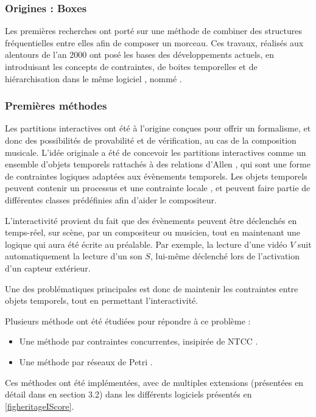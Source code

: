 \subsubsection{Origines : Boxes}
Les premières recherches ont porté sur une méthode de combiner des structures fréquentielles entre elles afin de composer un morceau. Ces travaux, réalisés aux alentours de l'an $\num{2000}$ ont posé les bases des développements actuels, en introduisant les concepts de contraintes, de boites temporelles et de hiérarchisation dans le même logiciel \cite{beurive2000logiciel}, nommé .
\subsubsection{Premières méthodes}
Les partitions interactives ont été à l'origine conçues pour offrir un formalisme, et donc des possibilités de provabilité et de vérification, au cas de la composition musicale. 
L'idée originale a été de concevoir les partitions interactives comme un ensemble d'objets temporels rattachés à des relations d'Allen \cite{allen1983maintaining}, qui sont une forme de contraintes logiques adaptées aux évènements temporels. Les objets temporels peuvent contenir un processus et une contrainte locale \cite{allombert2007system}, et peuvent faire partie de différentes classes prédéfinies afin d'aider le compositeur. 

L'interactivité provient du fait que des évènements peuvent être déclenchés en temps-réel, sur scène, par un compositeur ou musicien, tout en maintenant une logique qui aura été écrite au préalable. Par exemple, la lecture d'une vidéo $V$ suit automatiquement la lecture d'un son $S$, lui-même déclenché lors de l'activation d'un capteur extérieur. 

Une des problématiques principales est donc de maintenir les contraintes entre objets temporels, tout en permettant l'interactivité.

Plusieurs méthode ont été étudiées pour répondre à ce problème :
\begin{itemize}
\item Une méthode par contraintes concurrentes, insipirée de \ac{NTCC} \cite{allombert2006concurrent}.
\item Une méthode par réseaux de Petri \cite{allombert2007system, allombert2009aspects}.
\end{itemize}

Ces méthodes ont été implémentées, avec de multiples extensions (présentées en détail dans \cite{toro2012structured} en section 3.2) dans les différents logiciels présentés en \cref{figheritageIScore}.

